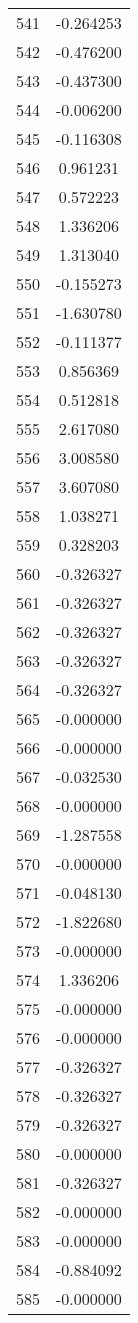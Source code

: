\documentclass[12pt]{article}
\begin{document}
\begin{longtable}{@{}cc@{}}
541 & -0.264253 \\
542 & -0.476200 \\
543 & -0.437300 \\
544 & -0.006200 \\
545 & -0.116308 \\
546 & 0.961231 \\
547 & 0.572223 \\
548 & 1.336206 \\
549 & 1.313040 \\
550 & -0.155273 \\
551 & -1.630780 \\
552 & -0.111377 \\
553 & 0.856369 \\
554 & 0.512818 \\
555 & 2.617080 \\
556 & 3.008580 \\
557 & 3.607080 \\
558 & 1.038271 \\
559 & 0.328203 \\
560 & -0.326327 \\
561 & -0.326327 \\
562 & -0.326327 \\
563 & -0.326327 \\
564 & -0.326327 \\
565 & -0.000000 \\
566 & -0.000000 \\
567 & -0.032530 \\
568 & -0.000000 \\
569 & -1.287558 \\
570 & -0.000000 \\
571 & -0.048130 \\
572 & -1.822680 \\
573 & -0.000000 \\
574 & 1.336206 \\
575 & -0.000000 \\
576 & -0.000000 \\
577 & -0.326327 \\
578 & -0.326327 \\
579 & -0.326327 \\
580 & -0.000000 \\
581 & -0.326327 \\
582 & -0.000000 \\
583 & -0.000000 \\
584 & -0.884092 \\
585 & -0.000000 \\

\end{longtable}
\end{document}
